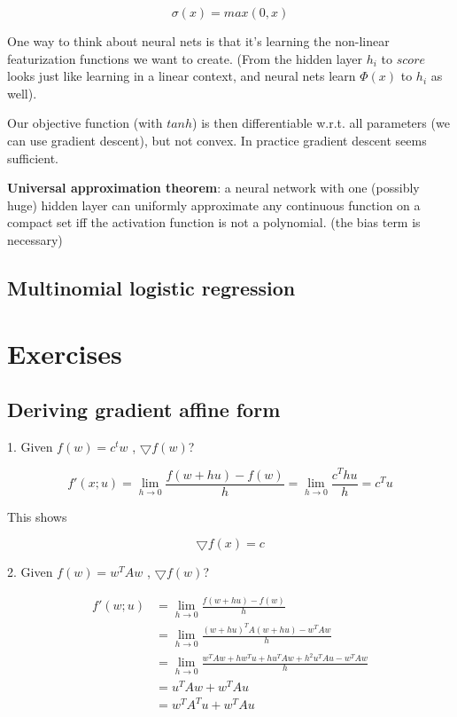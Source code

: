 \documentclass{article}
\begin{document}
$$
\sigma(x) = max(0, x)
$$

One way to think about neural nets is that it's learning the non-linear featurization functions we want to create.
(From the hidden layer $h_i$ to $score$ looks just like learning in a linear context, and neural nets learn $\Phi(x)$ to $h_i$ as well).

Our objective function (with $tanh$) is then differentiable w.r.t. all parameters (we can use gradient descent), but not convex.
In practice gradient descent seems sufficient.

\textbf{Universal approximation theorem}: a neural network with one (possibly huge) hidden layer can uniformly approximate any continuous function on a compact set iff the activation function is not a polynomial. (the bias term is necessary)

\subsection{Multinomial logistic regression}




\section{Exercises}

\subsection{Deriving gradient affine form}

1. Given $f(w) = c^{t} w$ , $\bigtriangledown f(w)$?

$$
f'(x; u) = \lim\limits_{h \to 0}{\frac{f(w + hu) - f(w)}{h}} = \lim\limits_{h \to 0}{\frac{c^{T} h u}{h}} = c^{T} u
$$

This shows

$$
\bigtriangledown f(x) = c
$$

2. Given $f(w) = w^{T} A w$ , $\bigtriangledown f(w)$?

\begin{align*}
f'(w; u) &= \lim\limits_{h \to 0}{\frac{f(w + hu) - f(w)}{h}} \\
         &= \lim\limits_{h \to 0}{\frac{(w + hu)^{T} A (w + hu) - w^{T} A w}{h}} \\
         &= \lim\limits_{h \to 0}{ \frac{w^{T} A w + h w^{T} u + h u^{T} A w + h^2 u^{T} A u - w^{T} A w}{h} } \\
         &= u^{T} A w + w^{T} A u \\
         &= w^{T} A^{T} u + w^{T} A u
\end{align*}
\end{document}

